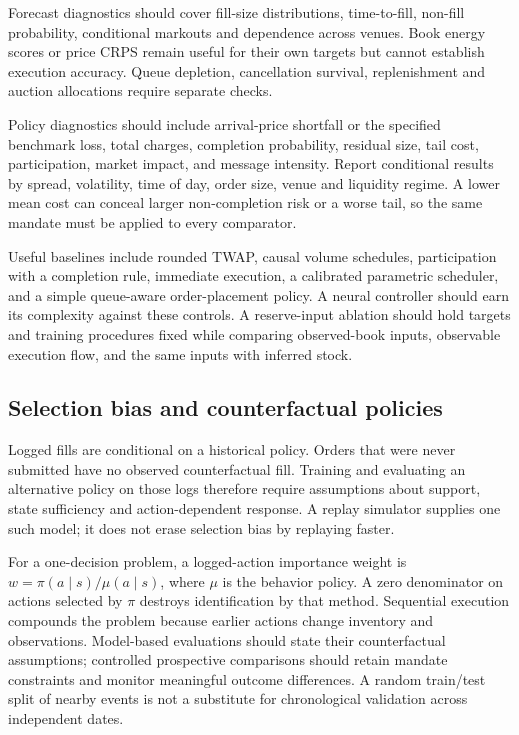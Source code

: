 \documentclass[11pt]{article}
\numberwithin{equation}{section}
\theoremstyle{definition}
\theoremstyle{remark}
\theoremstyle{definition}
\begin{document}
Forecast diagnostics should cover fill-size distributions, time-to-fill,
non-fill probability, conditional markouts and dependence across venues.
Book energy scores or price CRPS remain useful for their own targets but
cannot establish execution accuracy. Queue depletion, cancellation survival,
replenishment and auction allocations require separate checks.

Policy diagnostics should include arrival-price shortfall or the specified
benchmark loss, total charges, completion probability, residual size, tail
cost, participation, market impact, and message intensity. Report conditional
results by spread, volatility, time of day, order size, venue and liquidity
regime. A lower mean cost can conceal larger non-completion risk or a worse
tail, so the same mandate must be applied to every comparator.

Useful baselines include rounded TWAP, causal volume schedules, participation
with a completion rule, immediate execution, a calibrated parametric scheduler,
and a simple queue-aware order-placement policy. A neural controller should
earn its complexity against these controls. A reserve-input ablation should
hold targets and training procedures fixed while comparing observed-book
inputs, observable execution flow, and the same inputs with inferred stock.

\subsection{Selection bias and counterfactual policies}

Logged fills are conditional on a historical policy. Orders that were never
submitted have no observed counterfactual fill. Training and evaluating an
alternative policy on those logs therefore require assumptions about support,
state sufficiency and action-dependent response. A replay simulator supplies
one such model; it does not erase selection bias by replaying faster.

For a one-decision problem, a logged-action importance weight is
$w=\pi(a\mid s)/\mu(a\mid s)$, where $\mu$ is the behavior policy. A zero
denominator on actions selected by $\pi$ destroys identification by that
method. Sequential execution compounds the problem because earlier actions
change inventory and observations. Model-based evaluations should state their
counterfactual assumptions; controlled prospective comparisons should retain
mandate constraints and monitor meaningful outcome differences. A random
train/test split of nearby events is not a substitute for chronological
validation across independent dates.
\end{document}
